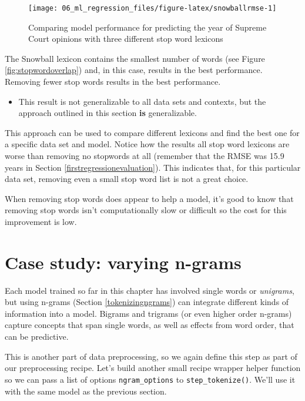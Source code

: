 \documentclass[
]{krantz}
\newenvironment{rmdblock}[1]
  {\begin{shaded*}
  \begin{itemize}[left = -1cm, labelsep = 1cm]
  \renewcommand{\labelitemi}{
    \raisebox{-.7\height}[0pt][0pt]{
      {\setkeys{Gin}{width=3em,keepaspectratio}\texttt{[image: images/\#1]}}
    }
  }
 
  \item
  }
  {
  \end{itemize}
  \end{shaded*}
  }
\newenvironment{rmdwarning}
  {\begin{rmdblock}{warning}}
  {\end{rmdblock}}
\begin{document}
\begin{figure}

{\centering \texttt{[image: 06\_ml\_regression\_files/figure-latex/snowballrmse-1]} 

}

\caption{Comparing model performance for predicting the year of Supreme Court opinions with three different stop word lexicons}\label{fig:snowballrmse}
\end{figure}

The Snowball lexicon contains the smallest number of words (see Figure \ref{fig:stopwordoverlap}) and, in this case, results in the best performance. Removing fewer stop words results in the best performance.

\begin{rmdwarning}
This result is not generalizable to all data sets and contexts, but the
approach outlined in this section \textbf{is} generalizable.
\end{rmdwarning}

This approach can be used to compare different lexicons and find the best one for a specific data set and model. Notice how the results all stop word lexicons are worse than removing no stopwords at all (remember that the RMSE was 15.9 years in Section \ref{firstregressionevaluation}). This indicates that, for this particular data set, removing even a small stop word list is not a great choice.

When removing stop words does appear to help a model, it's good to know that removing stop words isn't computationally slow or difficult so the cost for this improvement is low.

\hypertarget{casestudyngrams}{%
\section{Case study: varying n-grams}\label{casestudyngrams}}

Each model trained so far in this chapter has involved single words or \emph{unigrams}, but using n-grams (Section \ref{tokenizingngrams}) can integrate different kinds of information into a model. Bigrams and trigrams (or even higher order n-grams) capture concepts that span single words, as well as effects from word order, that can be predictive.

This is another part of data preprocessing, so we again define this step as part of our preprocessing recipe. Let's build another small recipe wrapper helper function so we can pass a list of options \texttt{ngram\_options} to \texttt{step\_tokenize()}. We'll use it with the same model as the previous section.
\end{document}
